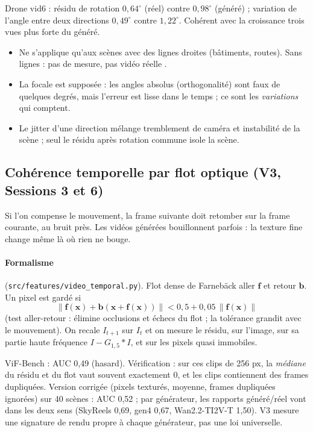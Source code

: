 \documentclass[11pt,a4paper]{article}
\newcommand{\x}{\mathbf{x}}
\begin{document}
\begin{resultat}
Drone vid6 : résidu de rotation $0{,}64^\circ$ (réel) contre $0{,}98^\circ$ (généré) ; variation de
l'angle entre deux directions $0{,}49^\circ$ contre $1{,}22^\circ$. Cohérent avec la croissance trois
vues plus forte du généré.
\end{resultat}

\begin{piege}
\begin{itemize}
  \item Ne s'applique qu'aux scènes avec des lignes droites (bâtiments, routes). Sans lignes : pas de
        mesure, pas \og vidéo réelle \fg.
  \item La focale est supposée : les angles absolus (orthogonalité) sont faux de quelques degrés, mais
        l'erreur est lisse dans le temps ; ce sont les \emph{variations} qui comptent.
  \item Le jitter d'une direction mélange tremblement de caméra et instabilité de la scène ; seul le
        résidu après rotation commune isole la scène.
\end{itemize}
\end{piege}

\subsection{Cohérence temporelle par flot optique (V3, Sessions 3 et 6)}

\begin{intuition}
Si l'on compense le mouvement, la frame suivante doit retomber sur la frame courante, au bruit près.
Les vidéos générées \og bouillonnent \fg{} parfois : la texture fine change même là où rien ne bouge.
\end{intuition}

\paragraph{Formalisme} (\texttt{src/features/video\_temporal.py}).
Flot dense de Farnebäck aller $\mathbf f$ et retour $\mathbf b$. Un pixel est gardé si
\[ \|\mathbf f(\x)+\mathbf b(\x+\mathbf f(\x))\| < 0{,}5+0{,}05\,\|\mathbf f(\x)\| \]
(test aller-retour : élimine occlusions et échecs du flot ; la tolérance grandit avec le mouvement).
On recale $I_{t+1}$ sur $I_t$ et on mesure le résidu, sur l'image, sur sa partie haute fréquence
$I-G_{1{,}5}*I$, et sur les pixels quasi immobiles.

\begin{resultat}
ViF-Bench : AUC 0,49 (hasard). Vérification : sur ces clips de 256 px, la \emph{médiane} du résidu et du
flot vaut souvent exactement 0, et les clips contiennent des frames dupliquées. Version corrigée
(pixels texturés, moyenne, frames dupliquées ignorées) sur 40 scènes : AUC 0,52 ; par générateur, les
rapports généré/réel vont dans les deux sens (SkyReels 0,69, gen4 0,67, Wan2.2-TI2V-T 1,50). V3 mesure
une signature de rendu propre à chaque générateur, pas une loi universelle.
\end{resultat}
\end{document}
